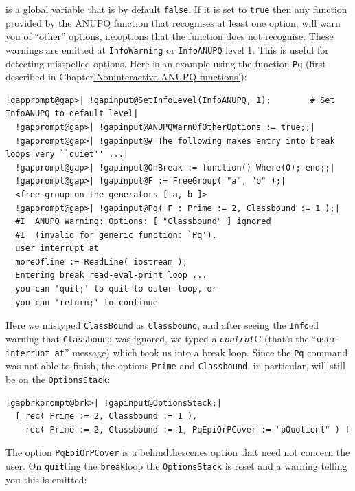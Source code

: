 \documentclass[a4paper,11pt]{report}
\begin{document}
{{{ is a global variable that is by default \texttt{false}. If it is set to \texttt{true} then any function provided by the \textsf{ANUPQ} function that recognises at least one option, will warn you of ``other'' options, i.e.{\nobreakspace}options that the function does not recognise.
These warnings are emitted at \texttt{InfoWarning} or \texttt{InfoANUPQ} level 1. This is useful for detecting mis\texttt{}spelled options.
Here is an example using the function \texttt{Pq} (first described in Chapter{\nobreakspace}\hyperref[non-interact]{`Non\texttt{}interactive ANUPQ functions'}): 
\begin{Verbatim}[commandchars=!@|,fontsize=\small,frame=single,label=Example]
  !gapprompt@gap>| !gapinput@SetInfoLevel(InfoANUPQ, 1);        # Set InfoANUPQ to default level|
  !gapprompt@gap>| !gapinput@ANUPQWarnOfOtherOptions := true;;|
  !gapprompt@gap>| !gapinput@# The following makes entry into break loops very ``quiet'' ...|
  !gapprompt@gap>| !gapinput@OnBreak := function() Where(0); end;;|
  !gapprompt@gap>| !gapinput@F := FreeGroup( "a", "b" );|
  <free group on the generators [ a, b ]>
  !gapprompt@gap>| !gapinput@Pq( F : Prime := 2, Classbound := 1 );|
  #I  ANUPQ Warning: Options: [ "Classbound" ] ignored
  #I  (invalid for generic function: `Pq').
  user interrupt at
  moreOfline := ReadLine( iostream );
  Entering break read-eval-print loop ...
  you can 'quit;' to quit to outer loop, or
  you can 'return;' to continue
\end{Verbatim}
 Here we mistyped \texttt{ClassBound} as \texttt{Classbound}, and after seeing the \texttt{Info}\texttt{}ed warning that \texttt{Classbound} was ignored, we typed a \mbox{\texttt{\mdseries\slshape control}}\texttt{}C (that's the ``\texttt{user interrupt at}'' message) which took us into a break loop. Since the \texttt{Pq} command was not able to finish, the options \texttt{Prime} and \texttt{Classbound}, in particular, will still be on the \texttt{OptionsStack}: 
\begin{Verbatim}[commandchars=!@|,fontsize=\small,frame=single,label=Example]
  !gapbrkprompt@brk>| !gapinput@OptionsStack;|
  [ rec( Prime := 2, Classbound := 1 ), 
    rec( Prime := 2, Classbound := 1, PqEpiOrPCover := "pQuotient" ) ]
\end{Verbatim}
 The option \texttt{PqEpiOrPCover} is a behind\texttt{}the\texttt{}scenes option that need
not concern the user. On \texttt{quit}ting the \texttt{break}\texttt{}loop the \texttt{OptionsStack} is reset and a warning telling you this is emitted: 
}}}
\end{document}

